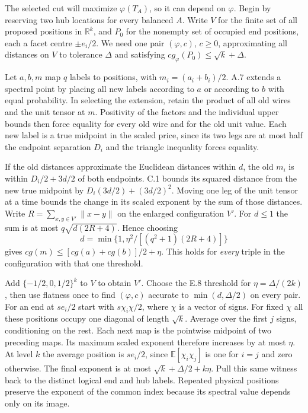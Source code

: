 \clearpage
{}
The selected cut will maximize $\varphi(T_A)$, so it can depend on $\varphi$. Begin by reserving two hub locations for every balanced $A$. Write $V$ for the finite set of all proposed positions in $\mathbb R^k$, and $P_0$ for the nonempty set of occupied end positions, each a facet centre $\pm e_i/2$. We need one pair $(\varphi,c)$, $c\ge0$, approximating all distances on $V$ to tolerance $\Delta$ and satisfying $c g_\varphi(P_0)\le\sqrt{k}+\Delta$.

Let $a,b,m$ map $q$ labels to positions, with $m_i=(a_i+b_i)/2$. A.7 extends a spectral point by placing all new labels according to $a$ or according to $b$ with equal probability. In selecting the extension, retain the product of all old wires and the unit tensor at $m$. Positivity of the factors and the individual upper bounds then force equality for every old wire and for the old unit value. Each new label is a true midpoint in the scaled price, since its two legs are at most half the endpoint separation $D_i$ and the triangle inequality forces equality.

If the old distances approximate the Euclidean distances within $d$, the old $m_i$ is within $D_i/2+3d/2$ of both endpoints. C.1 bounds its squared distance from the new true midpoint by $D_i(3d/2)+(3d/2)^2$. Moving one leg of the unit tensor at a time bounds the change in its scaled exponent by the sum of those distances. Write $R=\sum_{x,y\in V'}\|x-y\|$ on the enlarged configuration $V'$. For $d\le1$ the sum is at most $q\sqrt{d(2R+4)}$. Hence choosing
\[
 d=\min\{1,\eta^2/[(q^2+1)(2R+4)]\}
\]
gives $c g(m)\le[cg(a)+cg(b)]/2+\eta$. This holds for \emph{every} triple in the configuration with that one threshold.

Add $\{-1/2,0,1/2\}^k$ to $V$ to obtain $V'$. Choose the E.8 threshold for $\eta=\Delta/(2k)$, then use flatness once to find $(\varphi,c)$ accurate to $\min(d,\Delta/2)$ on every pair. For an end at $s e_i/2$ start with $s\chi_i\chi/2$, where $\chi$ is a vector of signs. For fixed $\chi$ all these positions occupy one diagonal of length $\sqrt{k}$. Average over the first $j$ signs, conditioning on the rest. Each next map is the pointwise midpoint of two preceding maps. Its maximum scaled exponent therefore increases by at most $\eta$. At level $k$ the average position is $s e_i/2$, since $\mathbb E[\chi_i\chi_j]$ is one for $i=j$ and zero otherwise. The final exponent is at most $\sqrt{k}+\Delta/2+k\eta$. Pull this same witness back to the distinct logical end and hub labels. Repeated physical positions preserve the exponent of the common index because its spectral value depends only on its image.

